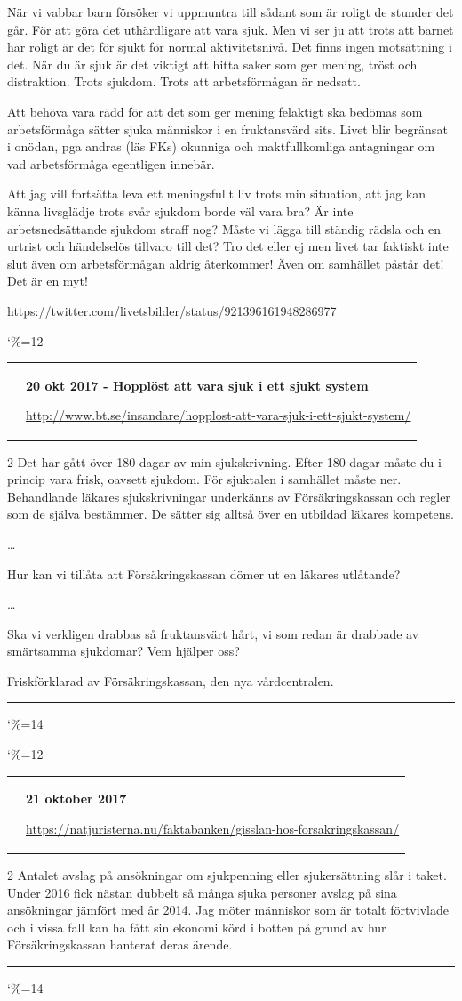 \documentclass[a4paper]{article}
\makeatletter
\newcommand{\entry}{
\catcode`\%=12
\@entry}
\newcommand{\@entry}[4][]{
\bigskip
\begin{tabular*}{\textwidth}{l m{\textwidth-4cm}}
\qrcode{#4} & \textbf{#2}

\medskip

\url{#4}

\end{tabular*}

\medskip


\begin{multicols}{2}
#3
\end{multicols}

#1

\medskip
\hrule

\catcode`\%=14
}
\makeatother
\begin{document}
{{{{När vi vabbar barn försöker vi uppmuntra till sådant som är roligt de stunder det går. För att göra det uthärdligare att vara sjuk.
Men vi ser ju att trots att barnet har roligt är det för sjukt för normal aktivitetsnivå. Det finns ingen motsättning i det.
När du är sjuk är det viktigt att hitta saker som ger mening, tröst och distraktion. Trots sjukdom. Trots att arbetsförmågan är nedsatt.

Att behöva vara rädd för att det som ger mening felaktigt ska bedömas som arbetsförmåga sätter sjuka människor i en fruktansvärd sits.
Livet blir begränsat i onödan, pga andras (läs FKs) okunniga och maktfullkomliga antagningar om vad arbetsförmåga egentligen innebär.

Att jag vill fortsätta leva ett meningsfullt liv trots min situation, att jag kan känna livsglädje trots svår sjukdom borde väl vara bra?
Är inte arbetsnedsättande sjukdom straff nog? Måste vi lägga till ständig rädsla och en urtrist och händelselös tillvaro till det?
Tro det eller ej men livet tar faktiskt inte slut även om arbetsförmågan aldrig återkommer! Även om samhället påstår det! Det är en myt!}
{https://twitter.com/livetsbilder/status/921396161948286977}


\entry{20 okt 2017 - Hopplöst att vara sjuk i ett sjukt system}{Det har gått över 180 dagar av min sjukskrivning. Efter 180 dagar måste du i princip vara frisk, oavsett sjukdom. För sjuktalen i samhället måste ner. Behandlande läkares sjukskrivningar underkänns av Försäkringskassan och regler som de själva bestämmer. De sätter sig alltså över en utbildad läkares kompetens.

\ldots

Hur kan vi tillåta att Försäkringskassan dömer ut en läkares utlåtande?

\ldots

Ska vi verkligen drabbas så fruktansvärt hårt, vi som redan är drabbade av smärtsamma sjukdomar? Vem hjälper oss?

Friskförklarad av Försäkringskassan, den nya vårdcentralen.}{http://www.bt.se/insandare/hopplost-att-vara-sjuk-i-ett-sjukt-system/}






\entry{21 oktober 2017}{Antalet avslag på ansökningar om sjukpenning eller sjukersättning slår i taket. Under 2016 fick nästan dubbelt så många sjuka personer avslag på sina ansökningar jämfört med år 2014. Jag möter människor som är totalt förtvivlade och i vissa fall kan ha fått sin ekonomi körd i botten på grund av hur Försäkringskassan hanterat deras ärende.}{https://natjuristerna.nu/faktabanken/gisslan-hos-forsakringskassan/}



}}}
\end{document}

